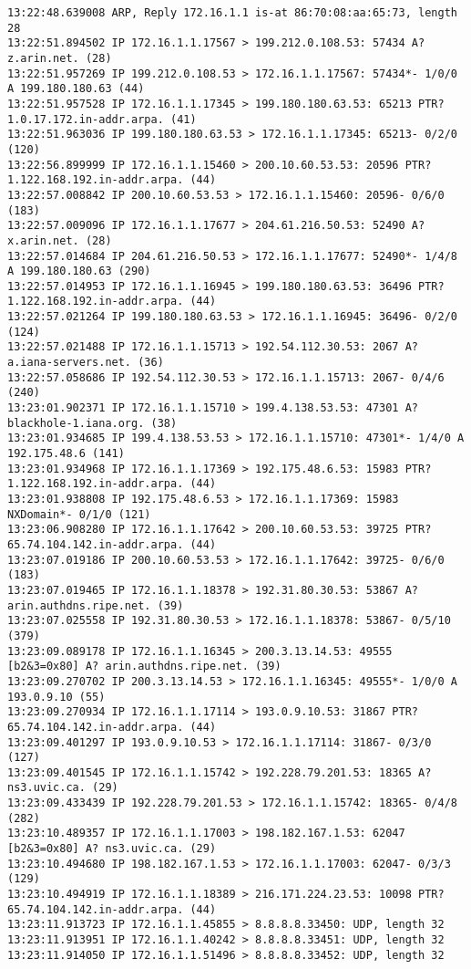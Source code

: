 \documentclass[
	letterpaper, %
	10pt, %
]{CSUniSchoolLabReport}
\begin{document}
\begin{center}
\begin{verbatim}
13:22:48.639008 ARP, Reply 172.16.1.1 is-at 86:70:08:aa:65:73, length 28
13:22:51.894502 IP 172.16.1.1.17567 > 199.212.0.108.53: 57434 A? z.arin.net. (28)
13:22:51.957269 IP 199.212.0.108.53 > 172.16.1.1.17567: 57434*- 1/0/0 A 199.180.180.63 (44)
13:22:51.957528 IP 172.16.1.1.17345 > 199.180.180.63.53: 65213 PTR? 1.0.17.172.in-addr.arpa. (41)
13:22:51.963036 IP 199.180.180.63.53 > 172.16.1.1.17345: 65213- 0/2/0 (120)
13:22:56.899999 IP 172.16.1.1.15460 > 200.10.60.53.53: 20596 PTR? 1.122.168.192.in-addr.arpa. (44)
13:22:57.008842 IP 200.10.60.53.53 > 172.16.1.1.15460: 20596- 0/6/0 (183)
13:22:57.009096 IP 172.16.1.1.17677 > 204.61.216.50.53: 52490 A? x.arin.net. (28)
13:22:57.014684 IP 204.61.216.50.53 > 172.16.1.1.17677: 52490*- 1/4/8 A 199.180.180.63 (290)
13:22:57.014953 IP 172.16.1.1.16945 > 199.180.180.63.53: 36496 PTR? 1.122.168.192.in-addr.arpa. (44)
13:22:57.021264 IP 199.180.180.63.53 > 172.16.1.1.16945: 36496- 0/2/0 (124)
13:22:57.021488 IP 172.16.1.1.15713 > 192.54.112.30.53: 2067 A? a.iana-servers.net. (36)
13:22:57.058686 IP 192.54.112.30.53 > 172.16.1.1.15713: 2067- 0/4/6 (240)
13:23:01.902371 IP 172.16.1.1.15710 > 199.4.138.53.53: 47301 A? blackhole-1.iana.org. (38)
13:23:01.934685 IP 199.4.138.53.53 > 172.16.1.1.15710: 47301*- 1/4/0 A 192.175.48.6 (141)
13:23:01.934968 IP 172.16.1.1.17369 > 192.175.48.6.53: 15983 PTR? 1.122.168.192.in-addr.arpa. (44)
13:23:01.938808 IP 192.175.48.6.53 > 172.16.1.1.17369: 15983 NXDomain*- 0/1/0 (121)
13:23:06.908280 IP 172.16.1.1.17642 > 200.10.60.53.53: 39725 PTR? 65.74.104.142.in-addr.arpa. (44)
13:23:07.019186 IP 200.10.60.53.53 > 172.16.1.1.17642: 39725- 0/6/0 (183)
13:23:07.019465 IP 172.16.1.1.18378 > 192.31.80.30.53: 53867 A? arin.authdns.ripe.net. (39)
13:23:07.025558 IP 192.31.80.30.53 > 172.16.1.1.18378: 53867- 0/5/10 (379)
13:23:09.089178 IP 172.16.1.1.16345 > 200.3.13.14.53: 49555 [b2&3=0x80] A? arin.authdns.ripe.net. (39)
13:23:09.270702 IP 200.3.13.14.53 > 172.16.1.1.16345: 49555*- 1/0/0 A 193.0.9.10 (55)
13:23:09.270934 IP 172.16.1.1.17114 > 193.0.9.10.53: 31867 PTR? 65.74.104.142.in-addr.arpa. (44)
13:23:09.401297 IP 193.0.9.10.53 > 172.16.1.1.17114: 31867- 0/3/0 (127)
13:23:09.401545 IP 172.16.1.1.15742 > 192.228.79.201.53: 18365 A? ns3.uvic.ca. (29)
13:23:09.433439 IP 192.228.79.201.53 > 172.16.1.1.15742: 18365- 0/4/8 (282)
13:23:10.489357 IP 172.16.1.1.17003 > 198.182.167.1.53: 62047 [b2&3=0x80] A? ns3.uvic.ca. (29)
13:23:10.494680 IP 198.182.167.1.53 > 172.16.1.1.17003: 62047- 0/3/3 (129)
13:23:10.494919 IP 172.16.1.1.18389 > 216.171.224.23.53: 10098 PTR? 65.74.104.142.in-addr.arpa. (44)
13:23:11.913723 IP 172.16.1.1.45855 > 8.8.8.8.33450: UDP, length 32
13:23:11.913951 IP 172.16.1.1.40242 > 8.8.8.8.33451: UDP, length 32
13:23:11.914050 IP 172.16.1.1.51496 > 8.8.8.8.33452: UDP, length 32

\end{verbatim}
\end{center}
\end{document}
